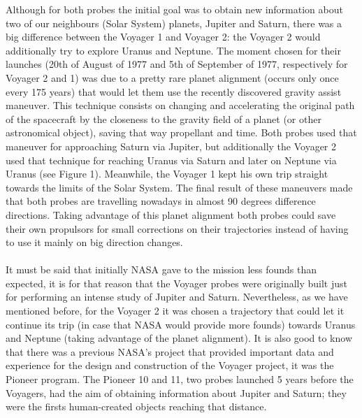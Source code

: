 \documentclass[11pt,a4paper]{article}
\begin{document}
Although for both probes the initial goal was to obtain new information about two of our neighbours (Solar System) planets, Jupiter and Saturn, there was a big difference between the Voyager 1 and Voyager 2: the Voyager 2 would additionally try to explore Uranus and Neptune. The moment chosen for their launches (20th of August of 1977 and 5th of September of 1977, respectively for Voyager 2 and 1) was due to a pretty rare planet alignment (occurs only once every 175 years) that would let them use the recently discovered gravity assist maneuver. This technique consists on changing and accelerating the original path of the spacecraft by the closeness to the gravity field of a planet (or other astronomical object), saving that way propellant and time. Both probes used that maneuver for approaching Saturn via Jupiter, but additionally the Voyager 2 used that technique for reaching Uranus via Saturn and later on Neptune via Uranus (see Figure 1). Meanwhile, the Voyager 1 kept his own trip straight towards the limits of the Solar System. The final result of these maneuvers made that both probes are travelling nowadays in almost 90 degrees difference directions. Taking advantage of this planet alignment both probes could save their own propulsors for small corrections on their trajectories instead of having to use it mainly on big direction changes.
\\\\
It must be said that initially NASA gave to the mission less founds than expected, it is for that reason that the Voyager probes were originally built just for performing an intense study of Jupiter and Saturn. Nevertheless, as we have mentioned before, for the Voyager 2 it was chosen a trajectory that could let it continue its trip (in case that NASA would provide more founds) towards Uranus and Neptune (taking advantage of the planet alignment). It is also good to know that there was a previous NASA’s project that provided important data and experience for the design and construction of the Voyager project, it was the Pioneer program. The Pioneer 10 and 11, two probes launched 5 years before the Voyagers, had the aim of obtaining information about Jupiter and Saturn; they were the firsts human-created objects reaching that distance.
\end{document}
